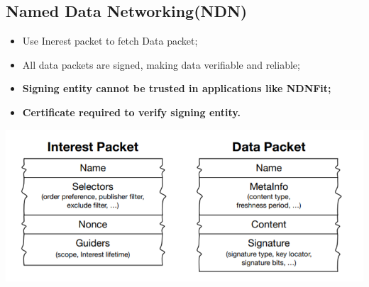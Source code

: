 \documentclass[a0,portrait]{poster}
\begin{document}
\begin{multicols}{2} %

\section*{Named Data Networking(NDN)\cite{zhang2014named}}
\par
	\begin{itemize}
		\item Use Inerest packet to fetch Data packet;
		\item All data packets are signed, making data verifiable and reliable;
\color{SaddleBrown}
		\item \large{\textbf{Signing entity cannot be trusted in applications like NDNFit;}}
		\item \large{\textbf{Certificate required to verify signing entity.}}
	\end{itemize}
\includegraphics[width=\linewidth]{figures/packet.png}
\color{DarkSlateGray} %


\begin{minipage}[b]{0.35\linewidth}


\end{minipage}
\end{multicols}
\end{document}
